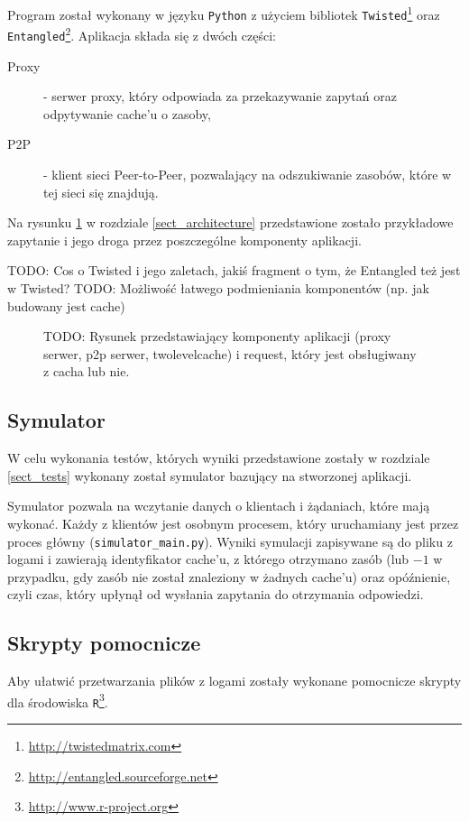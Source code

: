 \documentclass[a4paper,11pt]{scrartcl}
\newcommand{\f}{\texttt}
\newcommand{\s}{ }
\newcommand{\keszu}{cache'u}
\begin{document}
Program został wykonany w języku \f{Python} z użyciem bibliotek \f{Twisted}\footnote{\url{http://twistedmatrix.com}} oraz \f{Entangled}\footnote{\url{http://entangled.sourceforge.net}}. Aplikacja składa się z dwóch części:
\begin{description}
  \item[Proxy]{ - serwer proxy, który odpowiada za przekazywanie zapytań oraz odpytywanie \keszu\s o zasoby,}
  \item[P2P]{ - klient sieci Peer-to-Peer, pozwalający na odszukiwanie zasobów, które w tej sieci się znajdują.}
\end{description}
Na rysunku \ref{fig_architecture} w rozdziale \ref{sect_architecture} przedstawione zostało przykładowe zapytanie i jego droga przez poszczególne komponenty aplikacji. 

TODO: Cos o Twisted i jego zaletach, jakiś fragment o tym, że Entangled też jest w Twisted?
TODO: Możliwość łatwego podmieniania komponentów (np. jak budowany jest cache)

\begin{figure}[h]
\caption{TODO: Rysunek przedstawiający komponenty aplikacji (proxy serwer, p2p serwer, twolevelcache) i request, który jest obsługiwany z cacha lub nie.}
\label{fig_architecture}
\end{figure}

\subsection{Symulator}
\label{sect_impl_simulator}
W celu wykonania testów, których wyniki przedstawione zostały w rozdziale \ref{sect_tests} wykonany został symulator bazujący na stworzonej aplikacji. 

Symulator pozwala na wczytanie danych o klientach i żądaniach, które mają wykonać. Każdy z klientów jest osobnym procesem, który uruchamiany jest przez proces główny (\f{simulator\_main.py}). Wyniki symulacji zapisywane są do pliku z logami i zawierają identyfikator \keszu, z którego otrzymano zasób (lub $-1$ w przypadku, gdy zasób nie został znaleziony w żadnych \keszu) oraz opóźnienie, czyli czas, który upłynął od wysłania zapytania do otrzymania odpowiedzi.

\subsection{Skrypty pomocnicze}
Aby ułatwić przetwarzania plików z logami zostały wykonane pomocnicze skrypty dla środowiska \f{R}\footnote{\url{http://www.r-project.org}}. 
\end{document}

